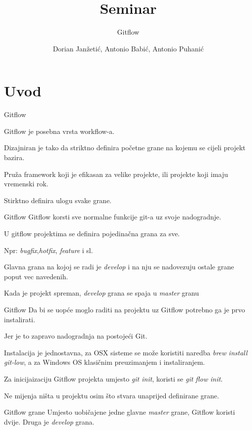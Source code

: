 \documentclass[10pt]{beamer}
\title{Seminar}
\subtitle{Gitflow}
\date{}
\author{Dorian Janžetić, Antonio Babić, Antonio Puhanić}
\institute{Tehnički Fakultet Rijeka}
\begin{document}
\maketitle

\section{Uvod}
\begin{frame}{Gitflow}

Gitflow je posebna vrsta workflow-a.

Dizajniran je tako da striktno definira početne grane na kojemu se cijeli projekt bazira.

Pruža framework koji je efikasan za velike projekte, ili projekte koji imaju vremenski rok.

Stirktno definira ulogu svake grane.
\end{frame}
\begin{frame}{Gitflow}
Gitflow korsti sve normalne funkcije git-a uz svoje nadogradnje.

U gitflow projektima se definira pojedinačna grana za sve.

Npr: \textit{bugfix},\textit{hotfix}, \textit{feature} i sl.

Glavna grana na kojoj se radi je \textit{develop} i na nju se nadovezuju ostale grane poput vec navedenih.

Kada je projekt spreman, \textit{develop} grana se spaja u \textit{master} granu

\end{frame}
\begin{frame}{Gitflow}
Da bi se uopće moglo raditi na projektu uz Gitflow potrebno ga je prvo instalirati.

Jer je to zapravo nadogradnja na postojeći Git.

Instalacija je jednostavna, za OSX sisteme se može koristiti naredba \textit{brew install git-low}, a za Windows OS klasičnim preuzimanjem i instaliranjem.

Za inicijaizaciju Gitflow projekta umjesto \textit{git init}, koristi se \textit{git flow init}.

Ne mijenja ništa u projektu osim što stvara unaprijed definirane grane.
\end{frame}
\begin{frame}{Gitflow grane}
Umjesto uobičajene jedne glavne \textit{master} grane, Gitflow koristi dvije.
Druga je \textit{develop} grana.

{
\setlength{\fboxsep}{1pt}
\setlength{\fboxrule}{1pt}
}

\end{frame}
\end{document}
